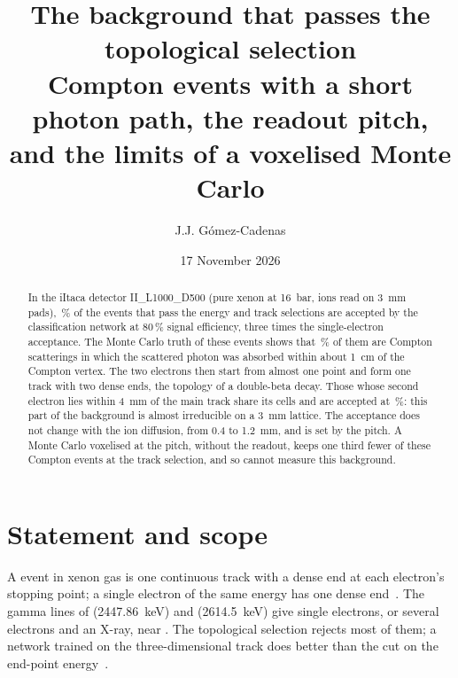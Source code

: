 \documentclass[11pt,a4paper]{article}
\title{The \BI background that passes the topological selection\\[4pt]
\large Compton events with a short photon path, the readout pitch,
and the limits of a voxelised Monte Carlo}
\author{J.J. G\'omez-Cadenas}
\date{17 November 2026}
\begin{document}
\maketitle
\begin{abstract}
In the iItaca detector II\_L1000\_D500 (pure xenon at 16~bar, ions read on
3~mm pads), \BiNet\,\% of the \BI events that pass the energy and track
selections are accepted by the classification network at 80\,\% signal
efficiency, three times the single-electron acceptance. The Monte Carlo truth
of these events shows that \ComptSharePassed\,\% of them are Compton
scatterings in which the scattered photon was absorbed within about 1~cm of
the Compton vertex. The two electrons then start from almost one point and
form one track with two dense ends, the topology of a double-beta decay.
Those whose second electron lies within 4~mm of the main track share its
cells and are accepted at \DistANet\,\%: this part of the background is
almost irreducible on a 3~mm lattice. The acceptance does not change with the
ion diffusion, from 0.4 to 1.2~mm, and is set by the pitch. A Monte Carlo
voxelised at the pitch, without the readout, keeps one third fewer of these
Compton events at the track selection, and so cannot measure this background.
\end{abstract}
\tableofcontents

\section{Statement and scope}
\label{sec:scope}
A \bbonu event in xenon gas is one continuous track with a dense end at each
electron's stopping point; a single electron of the same energy has one dense
end~\cite{Ferrario:2015kta,Ferrario:2019kwg}. The gamma lines of \BI
(2447.86~keV) and \TL (2614.5~keV) give single electrons, or several
electrons and an X-ray, near \Qbb. The topological selection rejects most of
them; a network trained on the three-dimensional track does better than the
cut on the end-point energy~\cite{Renner:2017ey,NEXT:2020jmz}.
\end{document}
